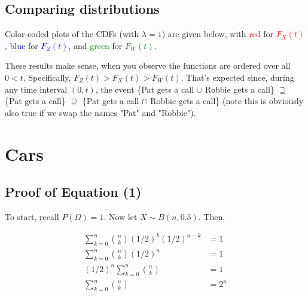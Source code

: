 \documentclass[paper=a4, fontsize=11pt]{scrartcl} %
\numberwithin{equation}{section} %
\numberwithin{figure}{section} %
\numberwithin{table}{section} %
\begin{document}
\subsection{Comparing distributions}

Color-coded plots of the CDFs (with $\lambda = 1$) are given below, with \textcolor{red}{red} for \textcolor{red}{$F_X(t)$},  \textcolor{blue}{blue} for \textcolor{blue}{$F_Z(t)$}, and  \textcolor{green}{green} for \textcolor{green}{$F_W(t)$}.

\begin{center}
\end{center}

These results make sense, when you observe the functions are ordered over all $0 < t$. Specifically, $F_Z(t) > F_X(t) > F_W(t)$. That's expected since, during any time interval $(0,t)$, the event \{Pat gets a call $\cup$ Robbie gets a call\} $\supseteq$ \{Pat gets a call\} $\supseteq$ \{Pat gets a call $\cap$ Robbie gets a call\} (note this is obviously also true if we swap the names "Pat" and "Robbie").


\section{Cars}

\subsection{Proof of Equation (1)}

To start, recall $P(\Omega) = 1$. Now let $X \sim B(n, 0.5)$. Then,

\begin{align*}
\sum_{k = 0}^n {{n}\choose{k}}(1/2)^k(1/2)^{n-k} &= 1\\
\sum_{k = 0}^n {{n}\choose{k}}(1/2)^n &= 1\\
(1/2)^n\sum_{k = 0}^n {{n}\choose{k}} &= 1\\
\sum_{k = 0}^n {{n}\choose{k}} &= 2^n
\end{align*}
\end{document}
